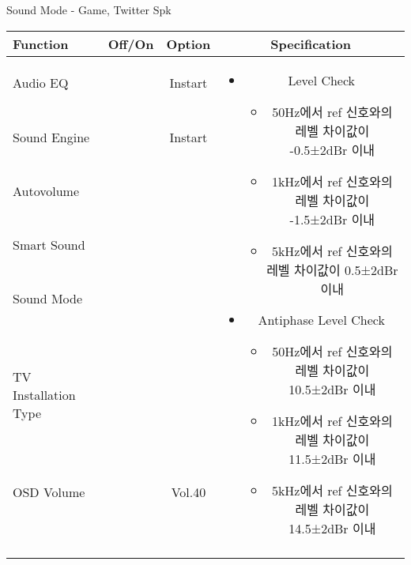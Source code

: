 \begin{frame}[t]{Sound Mode - Game, Twitter Spk}
\begin{tiny}
\begin{tabular}{@{}lccc@{}}
\toprule
Function & Off/On & Option & Specification \\
\midrule
Audio EQ & \color{black}{Off} & Instart &
\multirow{10}{60mm}{
\begin{itemize}
    \item Level Check
    \begin{itemize}
        \item 50Hz에서 ref 신호와의 레벨 차이값이 -0.5±2dBr 이내
        \item 1kHz에서 ref 신호와의 레벨 차이값이 -1.5±2dBr 이내
        \item 5kHz에서 ref 신호와의 레벨 차이값이 0.5±2dBr 이내
    \end{itemize}
    \item Antiphase Level Check
    \begin{itemize}
        \item 50Hz에서 ref 신호와의 레벨 차이값이 10.5±2dBr 이내
        \item 1kHz에서 ref 신호와의 레벨 차이값이 11.5±2dBr 이내
        \item 5kHz에서 ref 신호와의 레벨 차이값이 14.5±2dBr 이내
    \end{itemize}
\end{itemize}
} \\
Sound Engine & \color{blue}{On} & Instart & \\
Autovolume & \color{black}{Off} & & \\
Smart Sound & \color{black}{Off} & & \\
Sound Mode & \color{blue}{On} & \color{blue}{Game} & \\
TV Installation Type & \color{blue}{On} & \color{black}{Standtype1} & \\
OSD Volume & \color{blue}{On} & Vol.40 & \\
& & & \\
& & & \\
& & & \\
& & & \\
\midrule
\end{tabular}
\end{tiny}

\end{frame}
